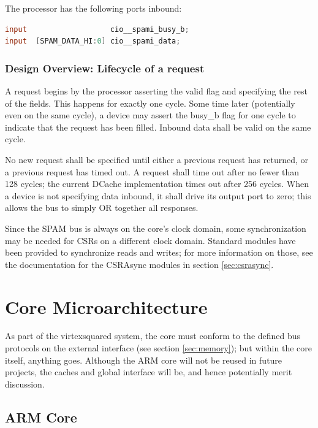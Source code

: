 \documentclass[10pt]{article}
\begin{document}
The processor has the following ports inbound:

\begin{lstlisting}[basicstyle=\footnotesize,language=Verilog]
input                   cio__spami_busy_b;
input  [SPAM_DATA_HI:0] cio__spami_data;
\end{lstlisting}

\subsubsection{Design Overview: Lifecycle of a request}

A request begins by the processor asserting the valid flag and specifying
the rest of the fields. This happens for exactly one cycle. Some time later
(potentially even on the same cycle), a device may assert the busy\_b flag
for one cycle to indicate that the request has been filled. Inbound data
shall be valid on the same cycle.

No new request shall be specified until either a previous request has returned, 
or a previous request has timed out. A request shall time out after no fewer 
than 128 cycles; the current DCache implementation times out after 256 cycles. 
When a device is not specifying data inbound, it shall drive its output port to 
zero; this allows the bus to simply OR together all responses.

Since the SPAM bus is always on the core's clock domain, some synchronization 
may be needed for CSRs on a different clock domain. Standard modules have been 
provided to synchronize reads and writes; for more information on those, see 
the documentation for the CSRAsync modules in section \ref{sec:csrasync}. 

\section{Core Microarchitecture}

As part of the virtexsquared system, the core must conform to the defined
bus protocols on the external interface (see section \ref{sec:memory}); but
within the core itself, anything goes.  Although the ARM core will not be
reused in future projects, the caches and global interface will be, and
hence potentially merit discussion.

\subsection{ARM Core}
\end{document}
